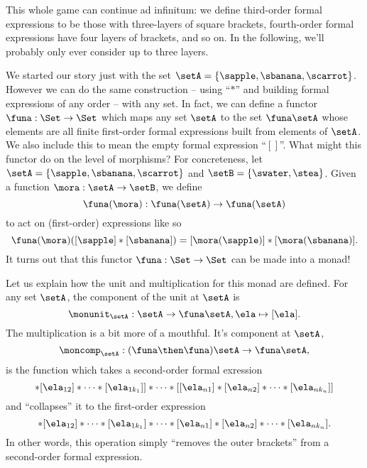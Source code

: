 This whole game can continue ad infinitum: we define third-order formal expressions to be those with three-layers of square brackets, fourth-order formal expressions have four layers of brackets, and so on.
In the following, we'll probably only ever consider up to three layers.

We started our story just with the set $\setA = \{ \sapple, \sbanana, \scarrot \}$.
However we can do the same construction -- using ``$*$'' and building formal expressions of any order -- with any set.
In fact, we can define a functor $\funa: \Set \to \Set$ which maps any set $\setA$ to the set $\funa \setA$ whose elements are all finite first-order formal expressions built from elements of $\setA$.
We also include this to mean the empty formal expression ``$[ ]$''.
What might this functor do on the level of morphisms?
For concreteness, let $\setA = \{ \sapple, \sbanana, \scarrot \} $ and $\setB = \{ \swater, \stea \}$.
Given a function $\mora: \setA \to \setB$, we define
\begin{equation}
	\funa(\mora) : \funa(\setA) \to \funa(\setA)
\end{equation}
to act on (first-order) expressions like so
\begin{equation}
	\funa(\mora)([\sapple]*[\sbanana]) = [\mora(\sapple)]*[\mora(\sbanana)].
\end{equation}
It turns out that this functor $\funa: \Set \to \Set$ can be made into a monad!

Let us explain how the unit and multiplication for this monad are defined.
For any set $\setA$, the component of the unit at $\setA$ is
\begin{equation}
	\monunit_\setA : \setA \to \funa \setA, \ela \mapsto [\ela].
\end{equation}
The multiplication is a bit more of a mouthful.
It's component at $\setA$,
\begin{equation}
	\moncomp_\setA : (\funa \then \funa)\setA \to \funa \setA,
\end{equation}
is the function which takes a second-order formal exression
\begin{equation}
	[[\ela_{11}]* [\ela_{12}] * \cdots * [\ela_{1k_1}]] * \cdots * [[\ela_{n1}]* [\ela_{n2}] * \cdots * [\ela_{nk_n}]]
\end{equation}
and ``collapses'' it to the first-order expression
\begin{equation}
	[\ela_{11}]
	* [\ela_{12}] * \cdots * [\ela_{1k_1}] * \cdots * [\ela_{n1}]* [\ela_{n2}] * \cdots * [\ela_{nk_n}].
\end{equation}
In other words, this operation simply ``removes the outer brackets'' from a second-order formal expression.

